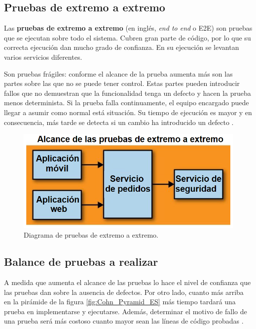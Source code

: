 \documentclass[11pt,spanish,listoffigures]{tfgetsinf}
\begin{document}
\subsection{Pruebas de extremo a extremo}

Las \textbf{pruebas de extremo a extremo} (en inglés, \textit{end to end} o E2E) \cite{Newman2015a} son pruebas que se ejecutan sobre todo el sistema. Cubren gran parte de código, por lo que su correcta ejecución dan mucho grado de confianza. En su ejecución se levantan varios servicios diferentes.

Son pruebas frágiles: conforme el alcance de la prueba aumenta más son las partes sobre las que no se puede tener control. Estas partes pueden introducir fallos que no demuestran que la funcionalidad tenga un defecto y hacen la prueba menos determinista. Si la prueba falla continuamente, el equipo encargado puede llegar a asumir como normal está situación. Su tiempo de ejecución es mayor y en consecuencia, más tarde se detecta si un cambio ha introducido un defecto \cite{Newman2015a}.

\begin{figure}[h]
\centering
\includegraphics[scale=0.5]{End_To_End_Test_ES}
\caption{Diagrama de pruebas de extremo a extremo.}
\end{figure}

\subsection{Balance de pruebas a realizar}

A medida que aumenta el alcance de las pruebas lo hace el nivel de confianza que las pruebas dan sobre la ausencia de defectos. Por otro lado, cuanto más arriba en la pirámide de la figura \ref{fig:Cohn_Pyramid_ES} más tiempo tardará una prueba en implementarse y ejecutarse. Además, determinar el motivo de fallo de una prueba será más costoso cuanto mayor sean las líneas de código probadas \cite{Cohn2010}.
\end{document}
